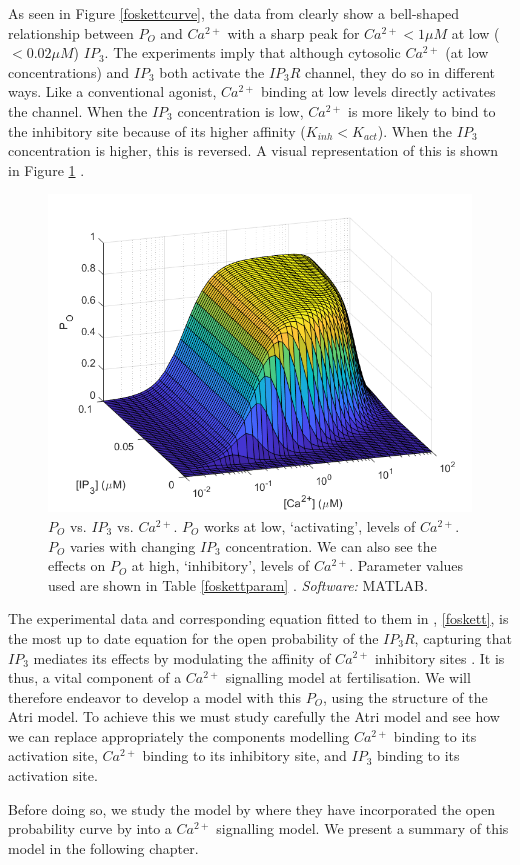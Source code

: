 As seen in Figure \ref{foskettcurve}, the data from  clearly show a bell-shaped relationship between $P_O$ and $Ca^{2+}$ with a sharp peak for $Ca^{2+}<1\mu M$ at low ($<0.02\mu M$) $IP_3$. The experiments imply that although cytosolic $Ca^{2+}$ (at low concentrations) and $IP_3$ both activate the $IP_3R$ channel, they do so in different ways. Like a conventional agonist, $Ca^{2+}$ binding at low levels directly activates the channel. When the $IP_3$ concentration is low, $Ca^{2+}$ is more likely to bind to the inhibitory site because of its higher affinity ($K_{inh}<K_{act}$). When the $IP_3$ concentration is higher, this is reversed. A visual representation of this is shown in Figure \ref{foskett3d1} \cite{Mak1998}.

\begin{figure}[!htbp]
\centering
\includegraphics[width=0.7\linewidth]{Chapters/3_IP3R_dynamics/extras/foskett3D2.png}
\caption{$P_O$ vs. $IP_3$ vs. $Ca^{2+}$. $P_O$ works at low, `activating', levels of $Ca^{2+}$. $P_O$ varies with changing $IP_3$ concentration. We can also see the effects on $P_O$ at high, `inhibitory', levels of $Ca^{2+}$. Parameter values used are shown in Table \ref{foskettparam} \cite{Mak1998}. \textit{Software:} MATLAB.}\label{foskett3d1}
\end{figure}

The experimental data and corresponding equation fitted to them in , \eqref{foskett}, is the most up to date equation for the open probability of the $IP_3R$, capturing that $IP_3$ mediates its effects by modulating the affinity of $Ca^{2+}$ inhibitory sites \cite{Mak1998}. It is thus, a vital component of a $Ca^{2+}$ signalling model at fertilisation. We will therefore endeavor to develop a model with this $P_O$, using the {structure of the} Atri model. To achieve this we must study carefully the Atri model and see how we can replace appropriately the components modelling $Ca^{2+}$ binding to its activation site, $Ca^{2+}$ binding to its inhibitory site, and $IP_3$ binding to its activation site.

Before doing so, we study the model by  where they have incorporated the open probability curve by  into a $Ca^{2+}$ signalling model. We present a summary of this model in the following chapter.